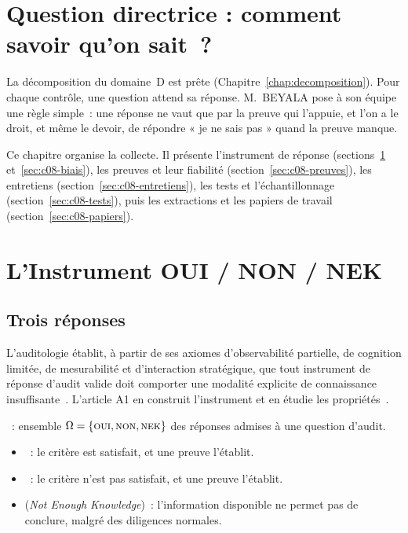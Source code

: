\bigskip

\section*{Question directrice : comment savoir qu'on sait~?}

La décomposition du domaine~D est prête (Chapitre~\ref{chap:decomposition}).
Pour chaque contrôle, une question attend sa réponse. M.~BEYALA pose à son
équipe une règle simple~: une réponse ne vaut que par la preuve qui
l'appuie, et l'on a le droit, et même le devoir, de répondre « je ne sais
pas » quand la preuve manque.

Ce chapitre organise la collecte. Il présente l'instrument de réponse
(sections~\ref{sec:c08-instrument} et~\ref{sec:c08-biais}), les preuves et
leur fiabilité (section~\ref{sec:c08-preuves}), les entretiens
(section~\ref{sec:c08-entretiens}), les tests et l'échantillonnage
(section~\ref{sec:c08-tests}), puis les extractions et les papiers de
travail (section~\ref{sec:c08-papiers}).

\separateur

\section{L'Instrument OUI / NON / NEK}
\label{sec:c08-instrument}

\subsection{Trois réponses}

L'auditologie établit, à partir de ses axiomes d'observabilité partielle, de
cognition limitée, de mesurabilité et d'interaction stratégique, que tout
instrument de réponse d'audit valide doit comporter une modalité explicite
de connaissance insuffisante~\cite{minka2026auditologie}. L'article A1 en
construit l'instrument et en étudie les propriétés~\cite{minka2026nek}.

\begin{boxdef}
~: ensemble $\Omega = \{\textsc{oui}, \textsc{non}, \textsc{nek}\}$ des réponses
admises à une question d'audit.
\begin{itemize}
    \item \OUI{}~: le critère est satisfait, et une preuve l'établit.
    \item \NON{}~: le critère n'est pas satisfait, et une preuve l'établit.
    \item \NEK{} (\textit{Not Enough Knowledge})~: l'information disponible
          ne permet pas de conclure, malgré des diligences normales.
\end{itemize}
\end{boxdef}

